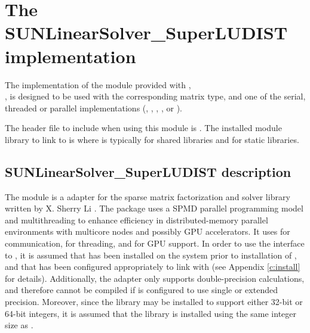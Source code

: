 \section{The SUNLinearSolver\_SuperLUDIST implementation}\label{ss:sunlinsol_sludist}

The {\superludist} implementation of the {\sunlinsol} module provided with
{\sundials},\\
\noindent{\sunlinsolsludist}, is designed to be used with the
corresponding {\sunmatslunrloc} matrix type, and one of the serial, threaded
or parallel {\nvector} implementations ({\nvecs}, {\nvecopenmp}, {\nvecpthreads},
{\nvecp}, or {\nvecph}).

The header file to include when using this module 
is . The installed module
library to link to is
where  is typically  for shared libraries and
 for static libraries.


\subsection{SUNLinearSolver\_SuperLUDIST description}\label{ss:sunlinsol_sludist_description}

The {\sunlinsolsludist} module is a {\sunlinsol} adapter for the
{\superludist} sparse matrix factorization and solver library written by
X. Sherry Li \cite{SuperLUDIST_site,GDL:07,LD:03,SLUUG:99}.
The package uses a SPMD parallel programming model and multithreading
to enhance efficiency in distributed-memory parallel environments with
multicore nodes and possibly GPU accelerators. It uses {\mpi} for communication,
{\openmp} for threading, and {\cuda} for GPU support. In order to use the
{\sunlinsolsludist} interface to {\superludist}, it is assumed that {\superludist}
has been installed on the system prior to installation of {\sundials}, and
that {\sundials} has been configured appropriately to link with {\superludist}
(see Appendix \ref{c:install} for details). Additionally, the adapter only
supports double-precision calculations, and therefore cannot be compiled if {\sundials}
is configured to use single or extended precision. Moreover, since the {\superludist}
library may be installed to support either 32-bit or 64-bit integers,
it is assumed that the {\superludist} library is installed using the same
integer size as {\sundials}.

